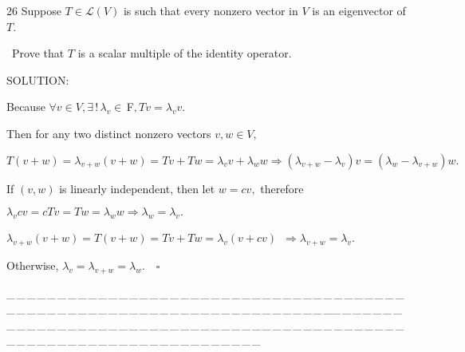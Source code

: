 \documentclass[a4paper, 11pt, UTF8]{article}
\def\Lm{\mathcal{L}}
\def\Fbfc{$\,{\timesbf F}$}
\begin{document}
\begin{large}
{\timesbf\Large 26} {\timessl\Large 
Suppose $T\in\Lm(V)$ is such that every nonzero vector in $V$ is an eigenvector of $T$.}\par\quad\,
{\timessl\Large Prove that $T$ is a scalar multiple of the identity operator.}\par
{\timesbf S\footnotesize{OLUTION:}}\par\quad
Because $\forall v\in V,\exists\,!\,\lambda_v\in\Fbfc,Tv=\lambda_v v.$\par\quad
Then for any two distinct nonzero vectors $v,w\in V,$\par\quad
$T(v+w)=\lambda_{v+w}(v+w)=Tv+Tw=\lambda_v v+\lambda_w w\Rightarrow(\lambda_{v+w}-\lambda_v)v=(\lambda_w-\lambda_{v+w})w.$\par\quad
If $(v,w)$ is linearly independent, then let $w=cv,$ therefore\par\qquad\qquad\qquad
$\lambda_v cv=cTv=Tw=\lambda_w w$\qquad\qquad\qquad\qquad\qquad\quad$\Rightarrow\lambda_w=\lambda_v.$\par\qquad\qquad\qquad
$\lambda_{v+w}(v+w)=T(v+w)=Tv+Tw=\lambda_v(v+cv)$ $\,\Rightarrow \lambda_{v+w}=\lambda_v.$\par\quad
Otherwise, $\lambda_v=\lambda_{v+w}=\lambda_w.\quad\square$
\par
{\tiny \_\,\_\,\_\,\_\,\_\,\_\,\_\,\_\,\_\,\_\,\_\,\_\,\_\,\_\,\_\,\_\,\_\,\_\,\_\,\_\,\_\,\_\,\_\,\_\,\_\,\_\,\_\,\_\,\_\,\_\,\_\,\_\,\_\,\_\,\_\,\_\,\_\,\_\,\_\,\_\,\_\,\_\,\_\,\_\,\_\,\_\,\_\,\_\,\_\,\_\,\_\,\_\,\_\,\_\,\_\,\_\,\_\,\_\,\_\,\_\,\_\,\_\,\_\,\_\,\_\,\_\,\_\,\_\,\_\,\_\,\_\_\,\_\,\_\,\_\,\_\,\_\,\_\,\_\,\_\,\_\,\_\,\_\,\_\,\_\,\_\,\_\,\_\,\_\,\_\,\_\,\_\,\_\,\_\,\_\,\_\,\_\,\_\,\_\,\_\,\_\,\_\,\_\,\_\,\_\,\_\,\_\,\_\,\_\,\_\,\_\,\_\,\_\,\_\,\_\,\_\,\_\,\_\,\_\,\_\,\_\,\_\,\_\,\_\,\_\,\_\,\_\,\_\,\_\,\_\,\_\,\_\,\_\,\_\,\_\,\_\,\_\,\_\,\_\,\_\,\_\,\_}{\tiny\,\par}


\end{large}
\end{document}

